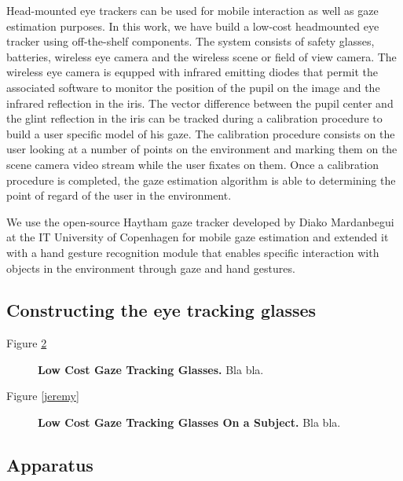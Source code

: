 \documentclass[jou,a4paper,notxfonts]{apa}
\begin{document}
Head-mounted eye trackers can be used for mobile interaction as well as gaze estimation purposes.
In this work, we have build a low-cost headmounted eye tracker using off-the-shelf components.  The system consists of
safety glasses, batteries, wireless eye camera and the wireless scene or field of view camera. The wireless eye camera
is equpped with infrared emitting diodes that permit the associated software to monitor the position of the pupil on the
image and the infrared reflection in the iris. The vector difference between the pupil center and the glint reflection
in the iris can be tracked during a calibration procedure to build a user specific model of his gaze. The calibration
procedure consists on the user looking at a number of points on the environment and marking them on the scene camera
video stream while the user fixates on them.  Once a calibration procedure is completed, the gaze estimation algorithm
is able to determining the point of regard of the user in the environment.


We use the open-source Haytham \cite{Mardanbegi2011} gaze tracker developed by Diako Mardanbegui at the IT University of
Copenhagen for mobile gaze estimation and extended it with a hand gesture recognition module that enables specific
interaction with objects in the environment through gaze and hand gestures.

\subsection{Constructing the eye tracking glasses}

Figure \ref{gazeTrackingGlasses}

\begin{figure}[tp]
 \caption{\textbf{Low Cost Gaze Tracking Glasses.} Bla bla.}
 \label{gazeTrackingGlasses}
\end{figure}


Figure \ref{jeremy}

\begin{figure}[tp]
 \caption{\textbf{Low Cost Gaze Tracking Glasses On a Subject.} Bla bla.}
 \label{gazeTrackingGlasses}
\end{figure}


\subsection{Apparatus}
\end{document}
